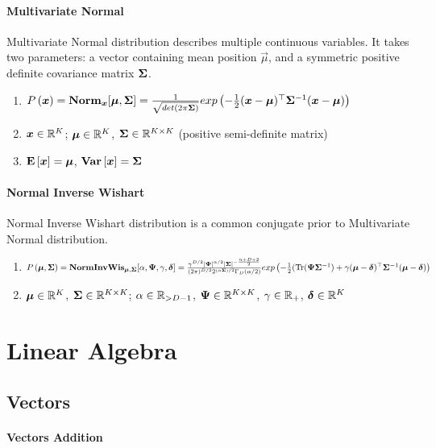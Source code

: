 \paragraph{Multivariate Normal}

Multivariate Normal distribution describes multiple continuous variables. It takes two parameters: a vector containing mean position $\vec{\mu}$, and a symmetric positive definite covariance matrix $\mathbf{\Sigma}$.
\begin{enumerate}
	\item $P\left(\boldsymbol{x}\right)=\mathbf{Norm}_{\boldsymbol{x}}[\boldsymbol{\mu},\mathbf{\Sigma}]=\frac{1}{\sqrt{det(2\pi\mathbf{\Sigma})}}exp\left(-\frac{1}{2}(\boldsymbol{x}-\boldsymbol{\mu}){}^\top\mathbf{\Sigma}^{-1}(\boldsymbol{x}-\boldsymbol{\mu})\right)$
	\item $\boldsymbol{x} \in \mathbb{R}^K$; $\boldsymbol{\mu} \in \mathbb{R}^K$, $\mathbf{\Sigma} \in \mathbb{R}^{K \times K}$ (positive semi-definite matrix)
	\item $\mathbf{E}\left[\boldsymbol{x}\right]=\boldsymbol{\mu}$, $\mathbf{Var}\left[\boldsymbol{x}\right]=\mathbf{\Sigma}$
\end{enumerate}

\paragraph{Normal Inverse Wishart}

Normal Inverse Wishart distribution is a common conjugate prior to Multivariate Normal distribution.
\begin{enumerate}
	\item $\P{\vec{\mu},\cov}=\NIW_{\vec{\mu},\cov}[\al,\vec{\Ps},\ga,\vec{\de}] \\ =\frac{\ga^{D/2}\det{\vec{\Ps}}^{\al/2}\det{\cov}^{-\frac{\al+D+2}{2}}}{(2\pi)^{D/2}2^{(\al\cov)/2}\Ga_D(\al/2)}\e{-\half(\Tr(\vec{\Ps}\cov\inv)+\ga(\vec{\mu}-\vec{\de})\T\cov\inv(\vec{\mu}-\vec{\de})}$
	\item $\boldsymbol{\mu} \in \mathbb{R}^K$, $\mathbf{\Sigma} \in \mathbb{R}^{K \times K}$; $\alpha \in \mathbb{R}_{>D-1}$, $\boldsymbol{\Psi} \in \mathbb{R}^{K \times K}$, $\gamma \in \mathbb{R}_+$, $\boldsymbol{\delta} \in \mathbb{R}^K$
\end{enumerate}



\section{Linear Algebra}
\label{section2.2}

\subsection{Vectors}

\paragraph{Vectors Addition}

